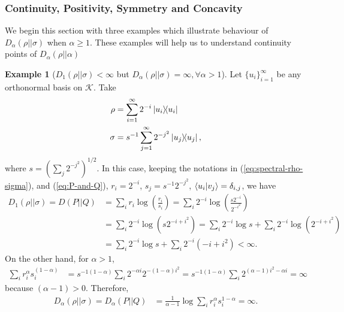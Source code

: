 \documentclass[12pt,a4paper,oneside]{article}
\numberwithin{equation}{section}
\theoremstyle{definition}  %
\newtheorem{eg}[defn]{Example}
\theoremstyle{plain}  %
\theoremstyle{remark} %
\newcommand{\CK}{\mathcal{K}}
\begin{document}
\subsubsection{Continuity, Positivity, Symmetry and Concavity} 
We begin this section with three examples which illustrate behaviour of $D_{\alpha}(\rho||\sigma)$ when $\alpha\geq 1.$ These examples will help us to understand continuity points of $D_{\alpha}(\rho||\alpha)$
\begin{eg}[$D_1(\rho||\sigma)<\infty$ but $D_{\alpha}(\rho||\sigma) = \infty, \forall \alpha >1$] Let $\{u_i\}_{i=1}^{\infty}$ be any orthonormal basis on $\CK $. Take \begin{align*}
    \rho &= \sum_{i=1}^{\infty}2^{-i}\ketbra{u_i}\\
    \sigma & =s^{-1} \sum_{j=1}^{\infty}2^{-j^2}\ketbra{u_j},
\end{align*}
 where $s=\left(\sum_j 2^{-j^2}\right)^{1/2}$. In this case, keeping the notations in (\ref{eq:spectral-rho-sigma}), and  (\ref{eq:P-and-Q}), $r_i=2^{-i}$, $s_j=s^{-1}2^{-j^2}$, $\braket{u_i}{v_j}= \delta_{i,j}$, we have
 \begin{align*}
     D_1(\rho||\sigma) = D(P||Q)&= \sum_{i}r_i\log \left( \frac{r_i}{s_i}\right) = \sum_{i}2^{-i}\log \left( \frac{s2^{-i}}{2^{-i^2}}\right)\\
     &= \sum_{i}2^{-i} \log \left(s2^{-i+i^2}\right)= \sum_{i}2^{-i} \log s+ \sum_{i}2^{-i} \log \left(2^{-i+i^2}\right) \\
     &= \sum_{i}2^{-i} \log s + \sum_{i}2^{-i}(-i+i^2) <\infty.
 \end{align*}
 On the other hand, for $\alpha>1$, \begin{align*}
     \sum_{i}r_i^{\alpha}s_i^{(1-\alpha)} &=s^{-1(1-\alpha)} \sum_{i}2^{-\alpha i}2^{-(1-\alpha)i^2} = s^{-1(1-\alpha)}\sum_{i}2^{(\alpha-1)i^2-\alpha i}=\infty
 \end{align*}
 because $(\alpha-1)>0$. Therefore,
 \begin{align*}
     D_{\alpha}(\rho||\sigma) = D_{\alpha}(P||Q)&= \frac{1}{\alpha-1} \log \sum_{i}r_i^{\alpha}s_i^{1-\alpha} = \infty. 
 \end{align*}
\end{eg}
\end{document}
